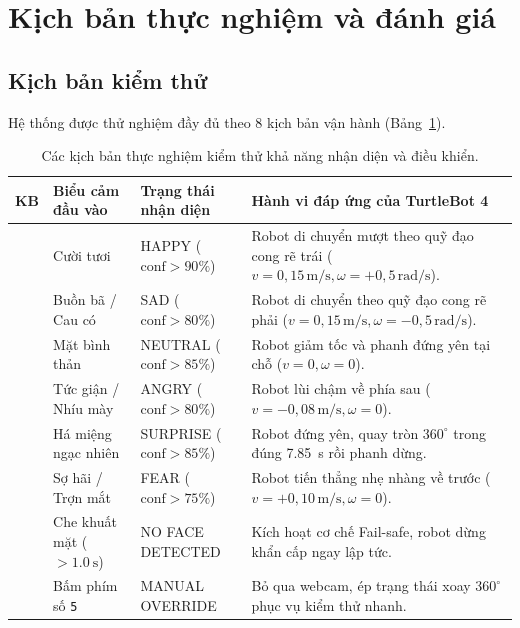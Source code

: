 \section{Kịch bản thực nghiệm và đánh giá}

\subsection{Kịch bản kiểm thử}
Hệ thống được thử nghiệm đầy đủ theo 8 kịch bản vận hành (Bảng~\ref{tab:test_scenarios}).

\begin{table}[H]
\centering
\footnotesize
\renewcommand{\arraystretch}{1.25}
\setlength{\tabcolsep}{3pt}
\begin{tabularx}{\textwidth}{
    >{\centering\arraybackslash}p{0.8cm}
    >{\raggedright\arraybackslash}p{2.6cm}
    >{\raggedright\arraybackslash}p{3.2cm}
    >{\raggedright\arraybackslash}X}
\toprule
\textbf{KB} & \textbf{Biểu cảm đầu vào} & \textbf{Trạng thái nhận diện} & \textbf{Hành vi đáp ứng của TurtleBot 4} \\
\midrule
1 & Cười tươi & HAPPY ($\text{conf} > 90\%$) & Robot di chuyển mượt theo quỹ đạo cong rẽ trái ($v=0{,}15\,\text{m/s}, \omega=+0{,}5\,\text{rad/s}$). \\
2 & Buồn bã / Cau có & SAD ($\text{conf} > 80\%$) & Robot di chuyển theo quỹ đạo cong rẽ phải ($v=0{,}15\,\text{m/s}, \omega=-0{,}5\,\text{rad/s}$). \\
3 & Mặt bình thản & NEUTRAL ($\text{conf} > 85\%$) & Robot giảm tốc và phanh đứng yên tại chỗ ($v=0, \omega=0$). \\
4 & Tức giận / Nhíu mày & ANGRY ($\text{conf} > 80\%$) & Robot lùi chậm về phía sau ($v=-0{,}08\,\text{m/s}, \omega=0$). \\
5 & Há miệng ngạc nhiên & SURPRISE ($\text{conf} > 85\%$) & Robot đứng yên, quay tròn $360^\circ$ trong đúng \SI{7.85}{\second} rồi phanh dừng. \\
6 & Sợ hãi / Trợn mắt & FEAR ($\text{conf} > 75\%$) & Robot tiến thẳng nhẹ nhàng về trước ($v=+0{,}10\,\text{m/s}, \omega=0$). \\
7 & Che khuất mặt ($> \SI{1.0}{\second}$) & NO FACE DETECTED & Kích hoạt cơ chế Fail-safe, robot dừng khẩn cấp ngay lập tức. \\
8 & Bấm phím số \texttt{5} & MANUAL OVERRIDE & Bỏ qua webcam, ép trạng thái xoay $360^\circ$ phục vụ kiểm thử nhanh. \\
\bottomrule
\end{tabularx}
\caption{Các kịch bản thực nghiệm kiểm thử khả năng nhận diện và điều khiển.}
\label{tab:test_scenarios}
\end{table}

